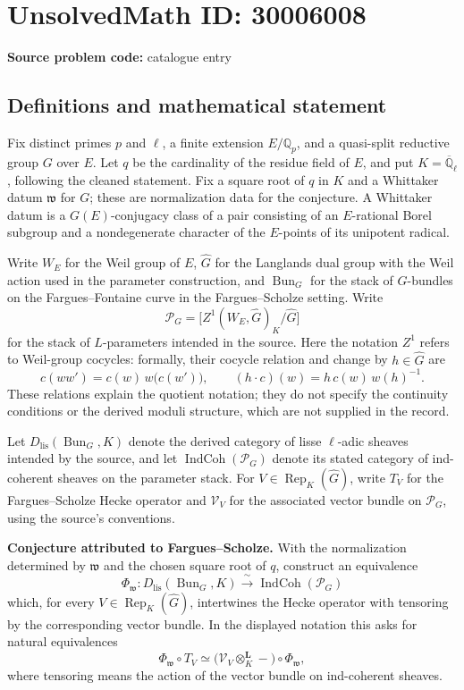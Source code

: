 \documentclass[11pt]{article}
\newcommand{\Q}{\mathbb{Q}}
\begin{document}
\section*{UnsolvedMath ID: 30006008}
\textbf{Source problem code:} catalogue entry
\subsection{Definitions and mathematical statement}
Fix distinct primes \(p\) and \(\ell\), a finite extension \(E/\Q_p\), and a quasi-split reductive group \(G\) over \(E\). Let \(q\) be the cardinality of the residue field of \(E\), and put \(K=\overline{\Q}_\ell\), following the cleaned statement. Fix a square root of \(q\) in \(K\) and a Whittaker datum \(\mathfrak w\) for \(G\); these are normalization data for the conjecture. A Whittaker datum is a \(G(E)\)-conjugacy class of a pair consisting of an \(E\)-rational Borel subgroup and a nondegenerate character of the \(E\)-points of its unipotent radical.

Write \(W_E\) for the Weil group of \(E\), \(\widehat G\) for the Langlands dual group with the Weil action used in the parameter construction, and \(\operatorname{Bun}_G\) for the stack of \(G\)-bundles on the Fargues--Fontaine curve in the Fargues--Scholze setting. Write
\[
\mathcal P_G=\bigl[Z^1(W_E,\widehat G)_K/\widehat G\bigr]
\]
for the stack of \(L\)-parameters intended in the source. Here the notation \(Z^1\) refers to Weil-group cocycles: formally, their cocycle relation and change by \(h\in\widehat G\) are
\[
c(ww')=c(w)\,w\bigl(c(w')\bigr),\qquad
(h\cdot c)(w)=h\,c(w)\,w(h)^{-1}.
\]
These relations explain the quotient notation; they do not specify the continuity conditions or the derived moduli structure, which are not supplied in the record.

Let \(D_{\mathrm{lis}}(\operatorname{Bun}_G,K)\) denote the derived category of lisse \(\ell\)-adic sheaves intended by the source, and let \(\operatorname{IndCoh}(\mathcal P_G)\) denote its stated category of ind-coherent sheaves on the parameter stack. For \(V\in\operatorname{Rep}_K(\widehat G)\), write \(T_V\) for the Fargues--Scholze Hecke operator and \(\mathcal V_V\) for the associated vector bundle on \(\mathcal P_G\), using the source's conventions.

\textbf{Conjecture attributed to Fargues--Scholze.} With the normalization determined by \(\mathfrak w\) and the chosen square root of \(q\), construct an equivalence
\[
\Phi_{\mathfrak w}:D_{\mathrm{lis}}(\operatorname{Bun}_G,K)
\xrightarrow{\ \sim\ }
\operatorname{IndCoh}(\mathcal P_G)
\]
which, for every \(V\in\operatorname{Rep}_K(\widehat G)\), intertwines the Hecke operator with tensoring by the corresponding vector bundle. In the displayed notation this asks for natural equivalences
\[
\Phi_{\mathfrak w}\circ T_V
\simeq
\bigl(\mathcal V_V\otimes_K^{\mathbf L} -\bigr)\circ\Phi_{\mathfrak w},
\]
where tensoring means the action of the vector bundle on ind-coherent sheaves.
\end{document}
